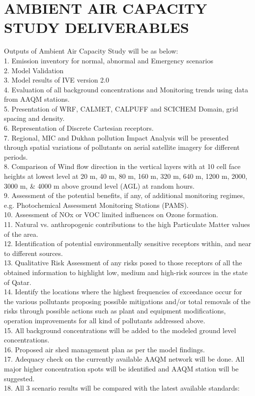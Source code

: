 \chapter{AMBIENT AIR CAPACITY STUDY DELIVERABLES}

Outputs of Ambient Air Capacity Study will be as below:\\

1.	Emission inventory for normal, abnormal and Emergency scenarios\\
2.	Model Validation \\
3.	Model results of IVE version 2.0 \\
4.	Evaluation of all background concentrations and Monitoring trends using data from AAQM stations. \\
5.	Presentation of WRF, CALMET, CALPUFF and SCICHEM Domain, grid spacing and density.\\
6.	Representation of Discrete Cartesian receptors.\\
7.	Regional, MIC and Dukhan pollution Impact Analysis will be presented through spatial variations of pollutants on aerial satellite imagery for different periods. \\
8.	Comparison of Wind flow direction in the vertical layers with at 10 cell face heights at lowest level at 20 m, 40 m, 80 m, 160 m, 320 m, 640 m, 1200 m, 2000, 3000 m, \& 4000 m above ground level (AGL) at random hours. \\
9.	Assessment of the potential benefits, if any, of additional monitoring regimes, e.g. Photochemical Assessment Monitoring Stations (PAMS). \\
10.	Assessment of NOx or VOC limited influences on Ozone formation. \\
11.	Natural vs. anthropogenic contributions to the high Particulate Matter values of the area. \\
12.	Identification of potential environmentally sensitive receptors within, and near to different sources. \\
13.	Qualitative Risk Assessment of any risks posed to those receptors of all the obtained information to highlight low, medium and high-risk sources in the state of Qatar. \\
14.	Identify the locations where the highest frequencies of exceedance occur for the various pollutants proposing possible mitigations and/or total removals of the risks through possible actions such as plant and equipment modifications, operation improvements for all kind of pollutants addressed above. \\
15.	All background concentrations will be added to the modeled ground level concentrations. \\
16.	Proposed air shed management plan as per the model findings. \\
17.	Adequacy check on the currently available AAQM network will be done. All major higher concentration spots will be identified and AAQM station will be suggested. \\
18.	All 3 scenario results will be compared with the latest available standards: 

